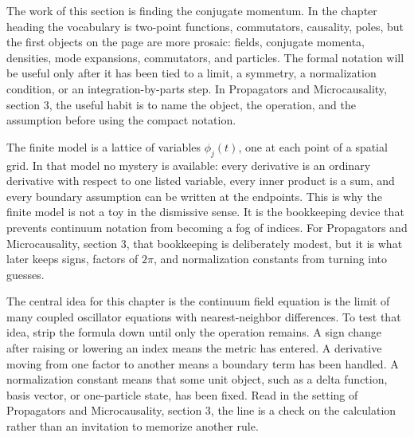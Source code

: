 











The work of this section is finding the conjugate momentum.  In the chapter heading the vocabulary is two-point functions, commutators, causality, poles, but the first objects on the page are more prosaic: fields, conjugate momenta, densities, mode expansions, commutators, and particles.  The formal notation will be useful only after it has been tied to a limit, a symmetry, a normalization condition, or an integration-by-parts step.  In Propagators and Microcausality, section 3, the useful habit is to name the object, the operation, and the assumption before using the compact notation.

The finite model is a lattice of variables \(\phi_j(t)\), one at each point of a spatial grid.  In that model no mystery is available: every derivative is an ordinary derivative with respect to one listed variable, every inner product is a sum, and every boundary assumption can be written at the endpoints.  This is why the finite model is not a toy in the dismissive sense.  It is the bookkeeping device that prevents continuum notation from becoming a fog of indices.  For Propagators and Microcausality, section 3, that bookkeeping is deliberately modest, but it is what later keeps signs, factors of \(2\pi\), and normalization constants from turning into guesses.

The central idea for this chapter is the continuum field equation is the limit of many coupled oscillator equations with nearest-neighbor differences.  To test that idea, strip the formula down until only the operation remains.  A sign change after raising or lowering an index means the metric has entered.  A derivative moving from one factor to another means a boundary term has been handled.  A normalization constant means that some unit object, such as a delta function, basis vector, or one-particle state, has been fixed.  Read in the setting of Propagators and Microcausality, section 3, the line is a check on the calculation rather than an invitation to memorize another rule.

